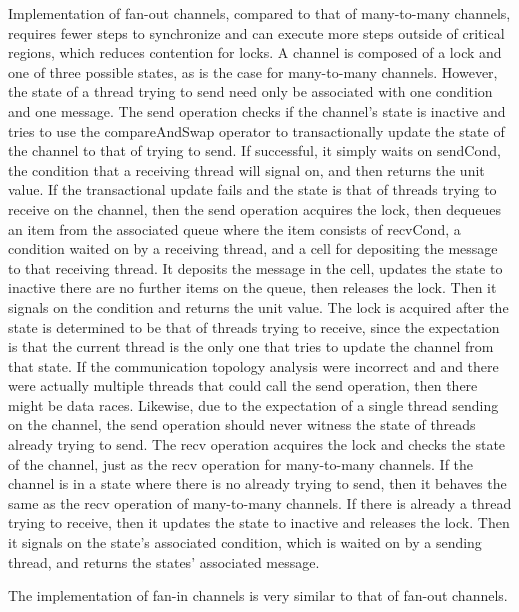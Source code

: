 \documentclass{article}
\begin{document}
  Implementation of fan-out channels, compared to that of many-to-many channels, requires fewer steps to synchronize and can execute more steps outside of critical regions, which reduces contention for locks.  A channel is composed of a lock and one of three possible states, as is the case for many-to-many channels.  However, the state of a thread trying to send need only be associated with one condition and one message.  
	The send operation checks if the channel's state is inactive and tries to use the compareAndSwap operator to transactionally update the state of the channel to that of trying to send.  If successful, it simply waits on sendCond, the condition that a receiving thread will signal on, and then returns the unit value.  If the transactional update fails and the state is that of threads trying to receive on the channel, then the send operation acquires the lock, then dequeues an item from the associated queue where the item consists of recvCond, a condition waited on by a receiving thread, and a cell for depositing the message to that receiving thread.  It deposits the message in the cell, updates the state to inactive there are no further items on the queue, then releases the lock.  Then it signals on the condition and returns the unit value. The lock is acquired after the state is determined to be that of threads trying to receive, since the expectation is that the current thread is the only one that tries to update the channel from that state.  If the communication topology analysis were incorrect and and there were actually multiple threads that could call the send operation, then there might be data races.  Likewise, due to the expectation of a single thread sending on the channel, the send operation should never witness the state of threads already trying to send.
	The recv operation acquires the lock and checks the state of the channel, just as the recv operation for many-to-many channels.  If the channel is in a state where there is no already trying to send, then it behaves the same as the recv operation of many-to-many channels.  If there is already a thread trying to receive, then it updates the state to inactive and releases the lock.  Then it signals on the state's associated condition, which is waited on by a sending thread, and returns the states' associated message.


  The implementation of fan-in channels is very similar to that of fan-out channels.
\end{document}
